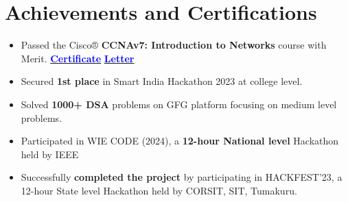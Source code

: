 \documentclass[a4paper,11pt]{article}
\begin{document}
\section*{Achievements and Certifications}
\vspace{-4pt}
\begin{itemize}[itemsep=0pt,parsep=0pt,topsep=0pt]
    \item Passed the Cisco® \textbf{CCNAv7: Introduction to Networks} course with Merit. \hspace{2mm} \textbf{\href{https://drive.google.com/file/d/1-_0SN1wPzEcyPiFIZ5yA6HVb3WBdVS2R/view?usp=drive_link}{\textcolor{blue}{Certificate}}} \hspace{2mm} \textbf{\href{https://drive.google.com/file/d/1i7EbomOafV_z36LP6yhh5H2o0MD85_3r/view?usp=sharing}{\textcolor{blue}{Letter}}}
    \item Secured \textbf{1st place} in Smart India Hackathon 2023 at college level.
    \item Solved \textbf{1000+ DSA} problems on GFG platform focusing on medium level problems.
    \item Participated in WIE CODE (2024), a \textbf{12-hour National level} Hackathon held by IEEE
    \item Successfully \textbf{completed the project} by participating in HACKFEST’23, a 12-hour State level Hackathon held by CORSIT, SIT, Tumakuru.

\end{itemize}
\end{document}
